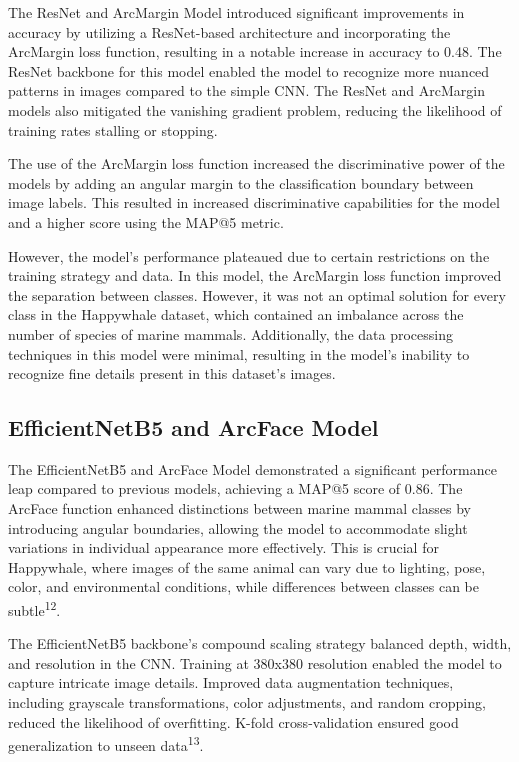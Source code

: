 \documentclass[twocolumn]{article}
\begin{document}
The ResNet and ArcMargin Model introduced significant improvements in accuracy by utilizing a ResNet-based architecture and incorporating the ArcMargin loss function, resulting in a notable increase in accuracy to 0.48. The ResNet backbone for this model enabled the model to recognize more nuanced patterns in images compared to the simple CNN. The ResNet and ArcMargin models also mitigated the vanishing gradient problem, reducing the likelihood of training rates stalling or stopping.

The use of the ArcMargin loss function increased the discriminative power of the models by adding an angular margin to the classification boundary between image labels. This resulted in increased discriminative capabilities for the model and a higher score using the MAP@5 metric.

However, the model's performance plateaued due to certain restrictions on the training strategy and data. In this model, the ArcMargin loss function improved the separation between classes. However, it was not an optimal solution for every class in the Happywhale dataset, which contained an imbalance across the number of species of marine mammals. Additionally, the data processing techniques in this model were minimal, resulting in the model's inability to recognize fine details present in this dataset's images.

\subsection{EfficientNetB5 and ArcFace Model}
The EfficientNetB5 and ArcFace Model demonstrated a significant performance leap compared to previous models, achieving a MAP@5 score of 0.86. The ArcFace function enhanced distinctions between marine mammal classes by introducing angular boundaries, allowing the model to accommodate slight variations in individual appearance more effectively. This is crucial for Happywhale, where images of the same animal can vary due to lighting, pose, color, and environmental conditions, while differences between classes can be subtle\textsuperscript{12}.

The EfficientNetB5 backbone's compound scaling strategy balanced depth, width, and resolution in the CNN. Training at 380x380 resolution enabled the model to capture intricate image details. Improved data augmentation techniques, including grayscale transformations, color adjustments, and random cropping, reduced the likelihood of overfitting. K-fold cross-validation ensured good generalization to unseen data\textsuperscript{13}.
\end{document}
